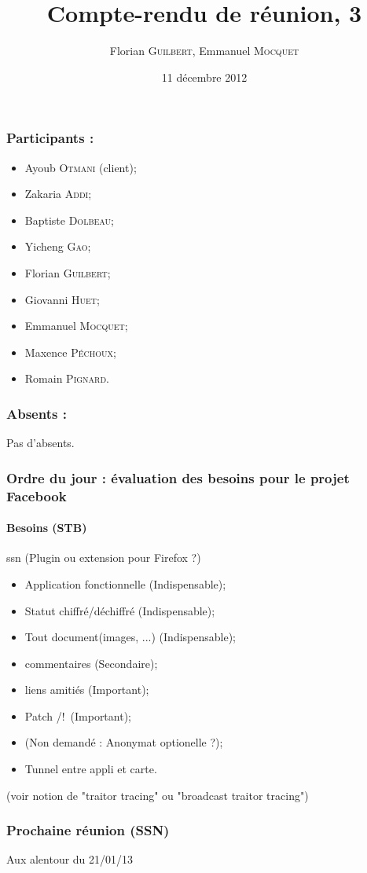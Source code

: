 \documentclass[a4paper,10pt]{article}
\author{Florian \textsc{Guilbert}, Emmanuel \textsc{Mocquet}}
\title{Compte-rendu de réunion, 3}
\date{11 décembre 2012}
\begin{document}
\maketitle

\subsubsection*{Participants : }
\begin{itemize}
    \item Ayoub \textsc{Otmani} (client);
    \item Zakaria \textsc{Addi};
    \item Baptiste \textsc{Dolbeau};
    \item Yicheng \textsc{Gao};
    \item Florian \textsc{Guilbert};
    \item Giovanni \textsc{Huet};
    \item Emmanuel \textsc{Mocquet};
    \item Maxence \textsc{Péchoux};
    \item Romain \textsc{Pignard}.
\end{itemize}

\subsubsection*{Absents : }
Pas d'absents.

\subsubsection*{Ordre du jour : évaluation des besoins pour le projet Facebook}

\paragraph{Besoins (STB)}
ssn (Plugin ou extension pour Firefox ?)
\begin{itemize}
        \item Application fonctionnelle (Indispensable);
        \item Statut chiffré/déchiffré (Indispensable);
        \item Tout document(images, ...) (Indispensable);
        \item commentaires (Secondaire);
        \item liens amitiés (Important);
        \item Patch /!\ (Important);
        \item (Non demandé : Anonymat optionelle ?);
        \item Tunnel entre appli et carte.
\end{itemize}
(voir notion de "traitor tracing" ou "broadcast traitor tracing")

\subsubsection*{Prochaine réunion (SSN)}
Aux alentour du 21/01/13
\end{document}
